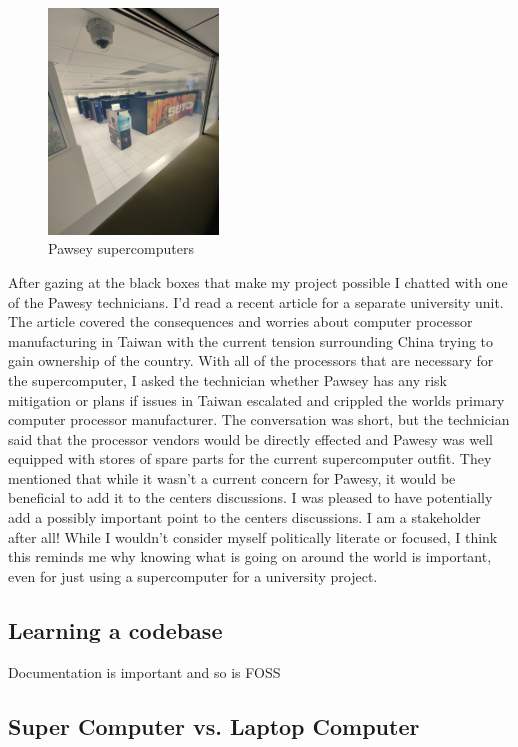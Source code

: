 \documentclass[11pt]{article}
\begin{document}
\begin{figure}[h!]
  \centering
  \includegraphics[height=6cm,angle=-90,origin=c]{graphics/pawsey}
  \caption{Pawsey supercomputers}
  \label{fig:pawsey}
\end{figure}
\FloatBarrier

After gazing at the black boxes that make my project possible I chatted with one of the Pawesy technicians. I'd read a recent article for a separate university unit. The article covered the consequences and worries about computer processor manufacturing in Taiwan with the current tension surrounding China trying to gain ownership of the country. With all of the processors that are necessary for the supercomputer, I asked the technician whether Pawsey has any risk mitigation or plans if issues in Taiwan escalated and crippled the worlds primary computer processor manufacturer. The conversation was short, but the technician said that the processor vendors would be directly effected and Pawesy was well equipped with stores of spare parts for the current supercomputer outfit. They mentioned that while it wasn't a current concern for Pawesy, it would be beneficial to add it to the centers discussions. I was pleased to have potentially add a possibly important point to the centers discussions. I am a stakeholder after all! While I wouldn't consider myself politically literate or focused, I think this reminds me why knowing what is going on around the world is important, even for just using a supercomputer for a university project.

\subsection{Learning a codebase}

Documentation is important and so is FOSS

\subsection{Super Computer vs. Laptop Computer}
\end{document}
